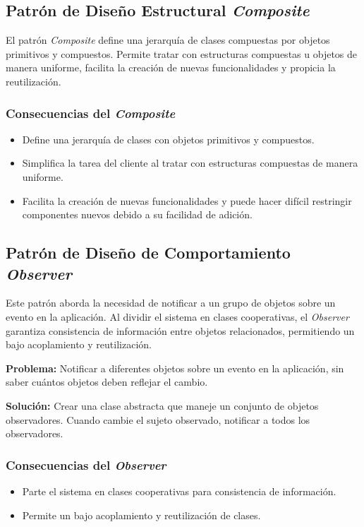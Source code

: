 \documentclass[11pt, twocolumn]{article}
\begin{document}
  \subsection*{Patrón de Diseño Estructural \textit{Composite}}
  El patrón \textit{Composite} define una jerarquía de clases compuestas por objetos primitivos y compuestos. Permite tratar con estructuras compuestas u objetos de manera uniforme, facilita la creación de nuevas funcionalidades y propicia la reutilización.

  \subsubsection*{Consecuencias del \textit{Composite}}
  \begin{itemize}
    \item Define una jerarquía de clases con objetos primitivos y compuestos.
    \item Simplifica la tarea del cliente al tratar con estructuras compuestas de manera uniforme.
    \item Facilita la creación de nuevas funcionalidades y puede hacer difícil restringir componentes nuevos debido a su facilidad de adición.
  \end{itemize}

  \subsection*{Patrón de Diseño de Comportamiento \textit{Observer}}
  Este patrón aborda la necesidad de notificar a un grupo de objetos sobre un evento en la aplicación. Al dividir el sistema en clases cooperativas, el \textit{Observer} garantiza consistencia de información entre objetos relacionados, permitiendo un bajo acoplamiento y reutilización.

  \textbf{Problema:} Notificar a diferentes objetos sobre un evento en la aplicación, sin saber cuántos objetos deben reflejar el cambio.

  \textbf{Solución:} Crear una clase abstracta que maneje un conjunto de objetos observadores. Cuando cambie el sujeto observado, notificar a todos los observadores.

  \subsubsection*{Consecuencias del \textit{Observer}}
  \begin{itemize}
    \item Parte el sistema en clases cooperativas para consistencia de información.
    \item Permite un bajo acoplamiento y reutilización de clases.
  \end{itemize}
\end{document}
